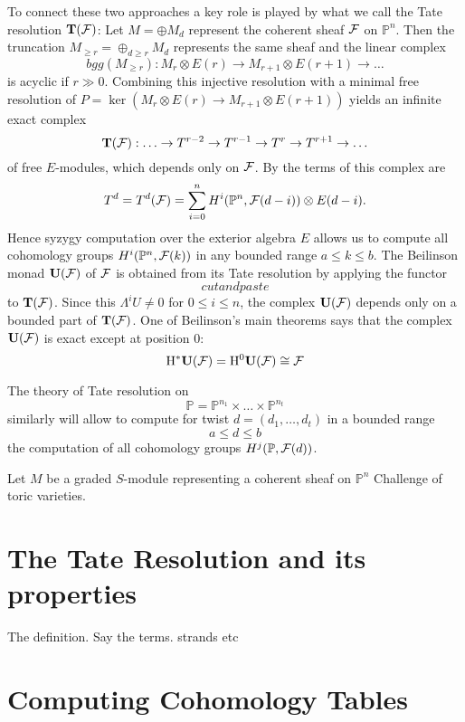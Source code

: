 \documentclass[twoside,12pt, leqno]{amsart}
\def\PP{{\mathbb P}}
\DeclareMathOperator{\rH}{{\rm H}}
\def\bT{{\bf T}}
\def\bU{{\bf U}}
\def\rH{{\rm H}}
\begin{document}
To connect these two approaches a key role is played by what we call the Tate resolution $\bf T({\mathcal F})$: Let $M=\oplus M_d$ represent the coherent sheaf ${\mathcal F}$ on $\PP^n$. Then the truncation $M_{\ge r} = \oplus_{d \ge r}M_d$ represents the same sheaf and the linear complex
$$bgg(M_{\ge r}) : M_r\otimes E(r) \to M_{r+1}\otimes E(r+1) \to \ldots$$ 
is acyclic if $r \gg 0$. Combining this injective resolution with a minimal free resolution of $P=\ker(M_r\otimes E(r) \to M_{r+1}\otimes E(r+1))$
yields an infinite exact complex
$${\bT}(\sF):   \ldots \to T^{r-2} \to T^{r-1} \to T^r \to T^{r+1} \to \ldots$$
of free $E$-modules, which depends only on ${\mathcal F}$. By \cite[Theorem x.y] {EFS} the terms of this complex are
$$T^d=T^d(\sF) = \sum_{i=0}^n H^i(\PP^n,\sF(d-i)) \otimes E(d-i).$$
 Hence syzygy computation over the exterior algebra $E$ allows us to compute all cohomology groups $H^i(\PP^n,\sF(k))$ in any bounded range
 $a \le k \le b$. The Beilinson monad $\bU(\sF)$ of ${\mathcal F}$ is obtained from its Tate resolution by applying the functor
 $$
 cut and paste
 $$
 to $\bT(\sF)$. Since this $\Lambda^i U \not=0$ for $0 \le i \le n$, the complex $\bU(\sF)$ depends only on a bounded part of $\bT(\sF)$.
 One of Beilinson's main theorems says that the complex $\bU(\sF)$ is exact except at position $0$:
 $$ \rH^* \bU(\sF) = \rH^0 \bU(\sF) \cong \sF$$
 
 \medskip

The theory of Tate resolution on 
$$
\PP = \PP^{n_1}\times \ldots \times \PP^{n_t}
$$
similarly will allow to compute for twist $d = (d_1,\ldots,d_t)$ in a bounded range
$$ a \le d \le b$$
the computation of all cohomology groups
$ H^j(\PP, \sF(d))$.


Let $M$ be a graded $S$-module representing a coherent sheaf on $\PP^n$
Challenge of toric varieties.

\section{The Tate Resolution and its properties}

The definition.  Say the terms.
strands etc

\section{Computing Cohomology Tables}
\end{document}
